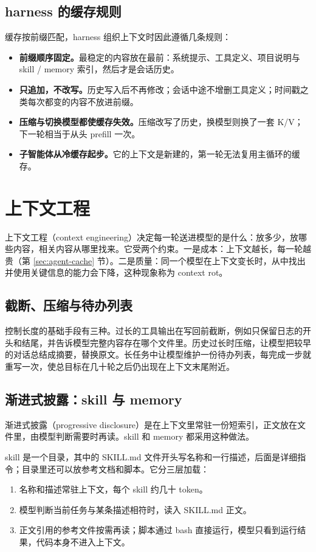 \subsection{harness 的缓存规则}

缓存按前缀匹配，harness 组织上下文时因此遵循几条规则：
\begin{itemize}
  \item \textbf{前缀顺序固定。}最稳定的内容放在最前：系统提示、工具定义、项目说明与 skill / memory 索引，然后才是会话历史。
  \item \textbf{只追加，不改写。}历史写入后不再修改；会话中途不增删工具定义；时间戳之类每次都变的内容不放进前缀。
  \item \textbf{压缩与切换模型都使缓存失效。}压缩改写了历史，换模型则换了一套 K/V；下一轮相当于从头 prefill 一次。
  \item \textbf{子智能体从冷缓存起步。}它的上下文是新建的，第一轮无法复用主循环的缓存。
\end{itemize}

\section{上下文工程}
\label{sec:agent-context}

上下文工程（context engineering）决定每一轮送进模型的是什么：放多少，放哪些内容，相关内容从哪里找来。它受两个约束。一是成本：上下文越长，每一轮越贵（第 \ref{sec:agent-cache} 节）。二是质量：同一个模型在上下文变长时，从中找出并使用关键信息的能力会下降，这种现象称为 context rot。

\subsection{截断、压缩与待办列表}

控制长度的基础手段有三种。过长的工具输出在写回前截断，例如只保留日志的开头和结尾，并告诉模型完整内容存在哪个文件里。历史过长时压缩，让模型把较早的对话总结成摘要，替换原文。长任务中让模型维护一份待办列表，每完成一步就重写一次，使总目标在几十轮之后仍出现在上下文末尾附近。

\subsection{渐进式披露：skill 与 memory}

渐进式披露（progressive disclosure）是在上下文里常驻一份短索引，正文放在文件里，由模型判断需要时再读。skill 和 memory 都采用这种做法。

skill 是一个目录，其中的 SKILL.md 文件开头写名称和一行描述，后面是详细指令；目录里还可以放参考文档和脚本。它分三层加载：
\begin{enumerate}
  \item 名称和描述常驻上下文，每个 skill 约几十 token。
  \item 模型判断当前任务与某条描述相符时，读入 SKILL.md 正文。
  \item 正文引用的参考文件按需再读；脚本通过 bash 直接运行，模型只看到运行结果，代码本身不进入上下文。
\end{enumerate}

